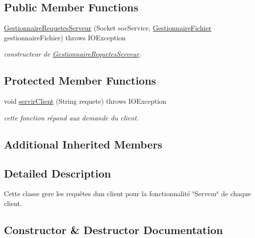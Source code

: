 \subsection*{Public Member Functions}
\begin{DoxyCompactItemize}
\item 
\hyperlink{classgestionnaireRequete_1_1GestionnaireRequetesServeur_a80cb3c0cc910d1678916bd93ea4175d3}{Gestionnaire\+Requetes\+Serveur} (Socket soc\+Service, \hyperlink{classterminalClient_1_1GestionnaireFichier}{Gestionnaire\+Fichier} gestionnaire\+Fichier)  throws I\+O\+Exception 
\begin{DoxyCompactList}\small\item\em constructeur de \hyperlink{classgestionnaireRequete_1_1GestionnaireRequetesServeur}{Gestionnaire\+Requetes\+Serveur}. \end{DoxyCompactList}\end{DoxyCompactItemize}
\subsection*{Protected Member Functions}
\begin{DoxyCompactItemize}
\item 
void \hyperlink{classgestionnaireRequete_1_1GestionnaireRequetesServeur_a20c9f53be4a6126872c97d813afb1b51}{servir\+Client} (String requete)  throws I\+O\+Exception 
\begin{DoxyCompactList}\small\item\em cette fonction répond aux demande du client. \end{DoxyCompactList}\end{DoxyCompactItemize}
\subsection*{Additional Inherited Members}


\subsection{Detailed Description}
Cette classe gere les requêtes d\textquotesingle{}un client pour la fonctionnalité \char`\"{}\+Serveur\char`\"{} de chaque client. 

\subsection{Constructor \& Destructor Documentation}
\mbox{\label{classgestionnaireRequete_1_1GestionnaireRequetesServeur_a80cb3c0cc910d1678916bd93ea4175d3}} 
